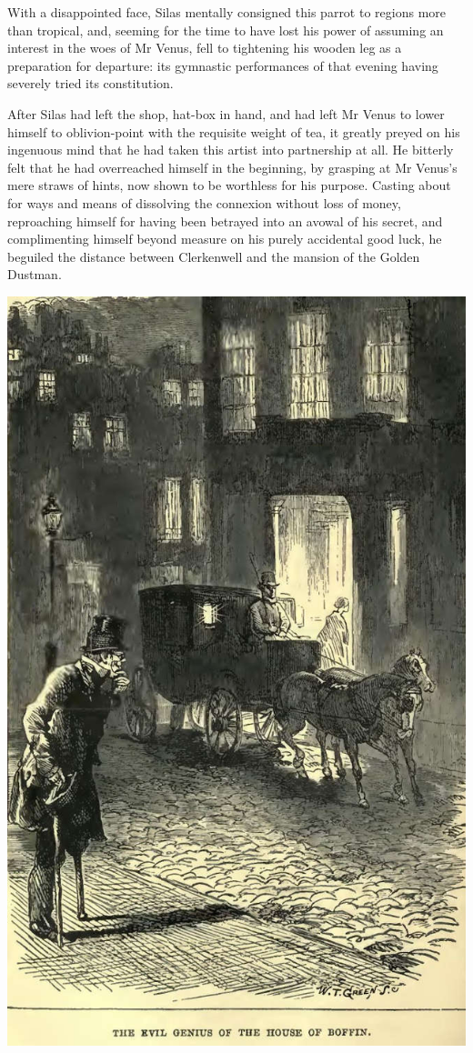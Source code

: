 With a disappointed face, Silas mentally consigned this parrot to
regions more than tropical, and, seeming for the time to have lost
his power of assuming an interest in the woes of Mr Venus, fell to
tightening his wooden leg as a preparation for departure: its gymnastic
performances of that evening having severely tried its constitution.

After Silas had left the shop, hat-box in hand, and had left Mr Venus
to lower himself to oblivion-point with the requisite weight of tea, it
greatly preyed on his ingenuous mind that he had taken this artist into
partnership at all. He bitterly felt that he had overreached himself in
the beginning, by grasping at Mr Venus’s mere straws of hints, now shown
to be worthless for his purpose. Casting about for ways and means of
dissolving the connexion without loss of money, reproaching himself for
having been betrayed into an avowal of his secret, and complimenting
himself beyond measure on his purely accidental good luck, he beguiled
the distance between Clerkenwell and the mansion of the Golden Dustman.

\includegraphics[scale=2.3]{03-07-01}

